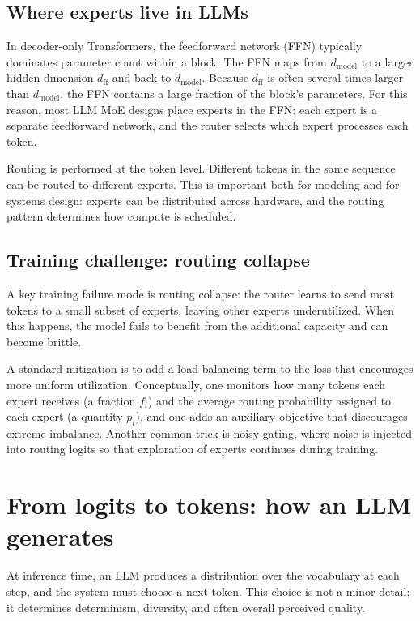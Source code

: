 \subsection{Where experts live in LLMs}
In decoder-only Transformers, the feedforward network (FFN) typically dominates parameter count within a block. The FFN maps from \(d_{\text{model}}\) to a larger hidden dimension \(d_{\text{ff}}\) and back to \(d_{\text{model}}\). Because \(d_{\text{ff}}\) is often several times larger than \(d_{\text{model}}\), the FFN contains a large fraction of the block’s parameters. For this reason, most LLM MoE designs place experts in the FFN: each expert is a separate feedforward network, and the router selects which expert processes each token.

Routing is performed at the token level. Different tokens in the same sequence can be routed to different experts. This is important both for modeling and for systems design: experts can be distributed across hardware, and the routing pattern determines how compute is scheduled.

\subsection{Training challenge: routing collapse}
A key training failure mode is routing collapse: the router learns to send most tokens to a small subset of experts, leaving other experts underutilized. When this happens, the model fails to benefit from the additional capacity and can become brittle.

A standard mitigation is to add a load-balancing term to the loss that encourages more uniform utilization. Conceptually, one monitors how many tokens each expert receives (a fraction \(f_i\)) and the average routing probability assigned to each expert (a quantity \(p_i\)), and one adds an auxiliary objective that discourages extreme imbalance. Another common trick is noisy gating, where noise is injected into routing logits so that exploration of experts continues during training.

\section{From logits to tokens: how an LLM generates}
At inference time, an LLM produces a distribution over the vocabulary at each step, and the system must choose a next token. This choice is not a minor detail; it determines determinism, diversity, and often overall perceived quality.

